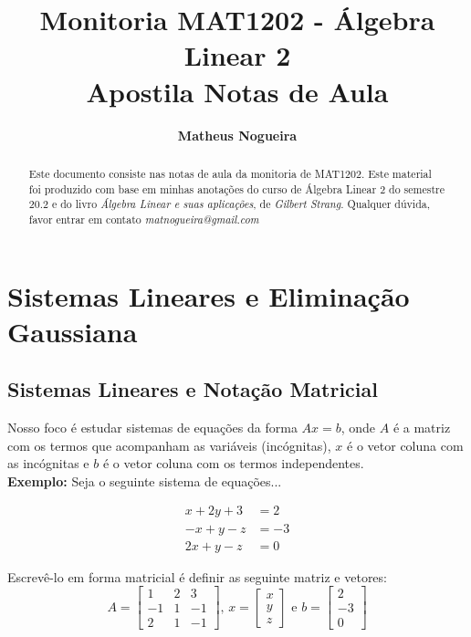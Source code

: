 \documentclass[12pt]{article}
\title{\textbf{Monitoria MAT1202 - Álgebra Linear 2 \\Apostila Notas de Aula }}
\author[]{\textbf{Matheus Nogueira}}
\date{}
\begin{document}
\maketitle
\begin{abstract}
	Este documento consiste nas notas de aula da monitoria de MAT1202. Este material foi produzido com base em minhas anotações do curso de Álgebra Linear 2 do semestre 20.2 e do livro \textit{Álgebra Linear e suas aplicações}, de \textit{Gilbert Strang}. Qualquer dúvida, favor entrar em contato \textit{matnogueira@gmail.com}
\end{abstract}
\tableofcontents
\pagebreak
\section{Sistemas Lineares e Eliminação Gaussiana}
\subsection{Sistemas Lineares e Notação Matricial}

Nosso foco é estudar sistemas de equações da forma $Ax=b$, onde $A$ é a matriz com os termos que acompanham as variáveis (incógnitas), $x$ é o vetor coluna com as incógnitas e $b$ é o vetor coluna com os termos independentes.\\

\textbf{Exemplo:} Seja o seguinte sistema de equações...

\begin{align*}
	x+2y+3&=2\\-x+y-z&=-3\\2x+y-z&=0
\end{align*}

Escrevê-lo em forma matricial é definir as seguinte matriz e vetores:
\begin{equation*}
	A=
	\begin{bmatrix}
		1 & 2 & 3\\
		-1 & 1 & -1\\
		2 & 1 & -1
	\end{bmatrix} \mbox{, } 
	x=
	\begin{bmatrix}
		x\\ y\\z
	\end{bmatrix} \mbox{ e } 
	b=
	\begin{bmatrix}
		2 \\ -3\\0
	\end{bmatrix}
\end{equation*}
\end{document}
